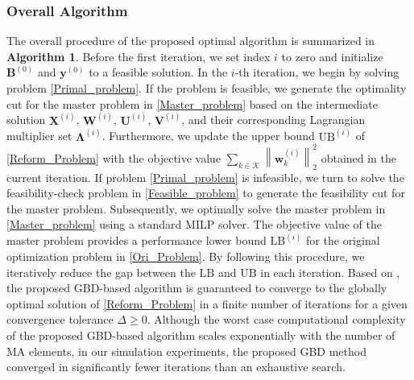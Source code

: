 \documentclass[12pt, draftclsnofoot, onecolumn]{IEEEtran}
\begin{document}
\subsubsection{Overall Algorithm}
The overall procedure of the proposed optimal algorithm is summarized in \textbf{Algorithm 1}. Before the first iteration, we set index $i$ to zero and initialize $\mathbf{B}^{(0)}$ and $\mathbf{y}^{(0)}$ to a feasible solution. In the $i$-th iteration, we begin by solving problem \eqref{Primal_problem}. If the problem is feasible, we generate the optimality cut for the master problem in \eqref{Master_problem} based on the intermediate solution $\mathbf{X}^{(i)}$, $\mathbf{W}^{(i)}$, $\mathbf{U}^{(i)}$, $\mathbf{V}^{(i)}$, and their corresponding Lagrangian multiplier set $\bm{\Lambda}^{(i)}$. Furthermore, we update the upper bound $\mathrm{UB}^{(i)}$ of \eqref{Reform_Problem} with the objective value $\sum_{k\in\mathcal{K}}\left\|\mathbf{w}_k^{(i)}\right\|_2^2$ obtained in the current iteration. If problem \eqref{Primal_problem} is infeasible, we turn to solve the feasibility-check problem in \eqref{Feasible_problem} to generate the feasibility cut for the master problem. Subsequently, we optimally solve the master problem in \eqref{Master_problem} using a standard MILP solver. The objective value of the master problem provides a performance lower bound $\mathrm{LB}^{(i)}$ for the original optimization problem in \eqref{Ori_Problem}. By following this procedure, we iteratively reduce the gap between the $\mathrm{LB}$ and $\mathrm{UB}$ in each iteration. Based on \cite[Theorem 2.4]{geoffrion1972generalized}, the proposed GBD-based algorithm is guaranteed to converge to the globally optimal solution of \eqref{Reform_Problem} in a finite number of iterations for a given convergence tolerance $\Delta\geq 0$. Although the worst case computational complexity of the proposed GBD-based algorithm scales exponentially with the number of MA elements, in our simulation experiments, the proposed GBD method converged in significantly fewer iterations than an exhaustive search.
\end{document}
